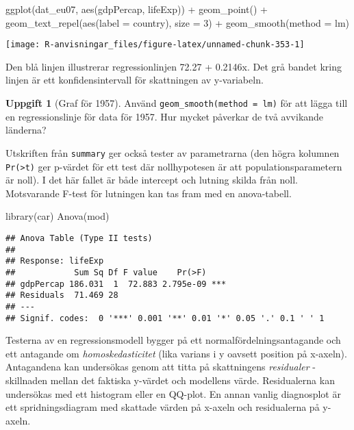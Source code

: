 \documentclass[
]{book}
\newenvironment{Shaded}{\begin{snugshade}}{\end{snugshade}}
\newcommand{\AttributeTok}[1]{\textcolor[rgb]{0.77,0.63,0.00}{#1}}
\newcommand{\DecValTok}[1]{\textcolor[rgb]{0.00,0.00,0.81}{#1}}
\newcommand{\FunctionTok}[1]{\textcolor[rgb]{0.00,0.00,0.00}{#1}}
\newcommand{\NormalTok}[1]{#1}
\newcommand{\SpecialCharTok}[1]{\textcolor[rgb]{0.00,0.00,0.00}{#1}}
\theoremstyle{definition}
\theoremstyle{definition}
\theoremstyle{definition}
\newtheorem{exercise}{Uppgift}[chapter]
\theoremstyle{definition}
\theoremstyle{remark}
\begin{document}
\begin{Shaded}
\begin{Highlighting}[]
\FunctionTok{ggplot}\NormalTok{(dat\_eu07, }\FunctionTok{aes}\NormalTok{(gdpPercap, lifeExp)) }\SpecialCharTok{+}
  \FunctionTok{geom\_point}\NormalTok{() }\SpecialCharTok{+}
  \FunctionTok{geom\_text\_repel}\NormalTok{(}\FunctionTok{aes}\NormalTok{(}\AttributeTok{label =}\NormalTok{ country), }\AttributeTok{size =} \DecValTok{3}\NormalTok{) }\SpecialCharTok{+}
  \FunctionTok{geom\_smooth}\NormalTok{(}\AttributeTok{method =}\NormalTok{ lm)}
\end{Highlighting}
\end{Shaded}

\begin{center}\texttt{[image: R-anvisningar\_files/figure-latex/unnamed-chunk-353-1]} \end{center}

Den blå linjen illustrerar regressionlinjen 72.27 + 0.2146x. Det grå bandet kring linjen är ett konfidensintervall för skattningen av y-variabeln.

\begin{exercise}[Graf för 1957]
Använd \texttt{geom\_smooth(method\ =\ lm)} för att lägga till en regressionslinje för data för 1957. Hur mycket påverkar de två avvikande länderna?
\end{exercise}

Utskriften från \texttt{summary} ger också tester av parametrarna (den högra kolumnen \texttt{Pr(\textgreater{}\textbar{}t\textbar{})} ger p-värdet för ett test där nollhypotesen är att populationsparametern är noll). I det här fallet är både intercept och lutning skilda från noll. Motsvarande F-test för lutningen kan tas fram med en anova-tabell.

\begin{Shaded}
\begin{Highlighting}[]
\FunctionTok{library}\NormalTok{(car)}
\FunctionTok{Anova}\NormalTok{(mod)}
\end{Highlighting}
\end{Shaded}

\begin{verbatim}
## Anova Table (Type II tests)
## 
## Response: lifeExp
##            Sum Sq Df F value    Pr(>F)    
## gdpPercap 186.031  1  72.883 2.795e-09 ***
## Residuals  71.469 28                      
## ---
## Signif. codes:  0 '***' 0.001 '**' 0.01 '*' 0.05 '.' 0.1 ' ' 1
\end{verbatim}

Testerna av en regressionsmodell bygger på ett normalfördelningsantagande och ett antagande om \emph{homoskedasticitet} (lika varians i y oavsett position på x-axeln). Antagandena kan undersökas genom att titta på skattningens \emph{residualer} - skillnaden mellan det faktiska y-värdet och modellens värde. Residualerna kan undersökas med ett histogram eller en QQ-plot. En annan vanlig diagnosplot är ett spridningsdiagram med skattade värden på x-axeln och residualerna på y-axeln.
\end{document}
